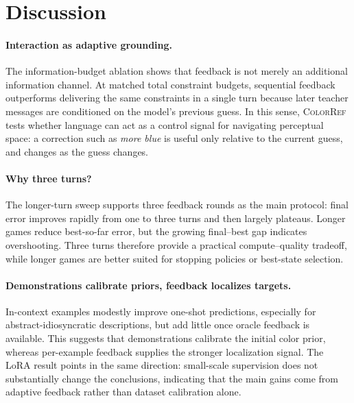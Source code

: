 \documentclass[11pt]{article}
\begin{document}


\section{Discussion}
\label{sec:discussion}

\paragraph{Interaction as adaptive grounding.}
The information-budget ablation shows that feedback is not merely an
additional information channel. At matched total constraint budgets,
sequential feedback outperforms delivering the same constraints in a single
turn because later teacher messages are conditioned on the model's previous
guess. In this sense, \textsc{ColorRef} tests whether language can act as a
control signal for navigating perceptual space: a correction such as
\textit{more blue} is useful only relative to the current guess, and changes
as the guess changes.

\paragraph{Why three turns?}
The longer-turn sweep supports three feedback rounds as the main protocol:
final error improves rapidly from one to three turns and then largely
plateaus. Longer games reduce best-so-far error, but the growing final--best
gap indicates overshooting. Three turns therefore provide a practical
compute--quality tradeoff, while longer games are better suited for stopping
policies or best-state selection.

\paragraph{Demonstrations calibrate priors, feedback localizes targets.}
In-context examples modestly improve one-shot predictions, especially for
abstract-idiosyncratic descriptions, but add little once oracle feedback is
available. This suggests that demonstrations calibrate the initial color
prior, whereas per-example feedback supplies the stronger localization
signal. The LoRA result points in the same direction: small-scale supervision
does not substantially change the conclusions, indicating that the main
gains come from adaptive feedback rather than dataset calibration alone.
\end{document}
